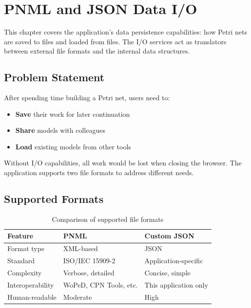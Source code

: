 \chapter{PNML and JSON Data I/O}
\label{chap:data-io}

This chapter covers the application's data persistence capabilities: how Petri nets are saved to files and loaded from files. The I/O services act as translators between external file formats and the internal data structures.

\section{Problem Statement}
\label{sec:io-problem}

After spending time building a Petri net, users need to:
\begin{itemize}
    \item \textbf{Save} their work for later continuation
    \item \textbf{Share} models with colleagues
    \item \textbf{Load} existing models from other tools
\end{itemize}

Without I/O capabilities, all work would be lost when closing the browser. The application supports two file formats to address different needs.

\section{Supported Formats}
\label{sec:io-formats}

\begin{table}[htb]
    \centering
    \begin{tabular}{lll}
        \toprule
        \textbf{Feature} & \textbf{PNML} & \textbf{Custom JSON} \\
        \midrule
        Format type & XML-based & JSON \\
        Standard & ISO/IEC 15909-2 & Application-specific \\
        Complexity & Verbose, detailed & Concise, simple \\
        Interoperability & WoPeD, CPN Tools, etc. & This application only \\
        Human-readable & Moderate & High \\
        \bottomrule
    \end{tabular}
    \caption{Comparison of supported file formats}
    \label{tab:format-comparison}
\end{table}

